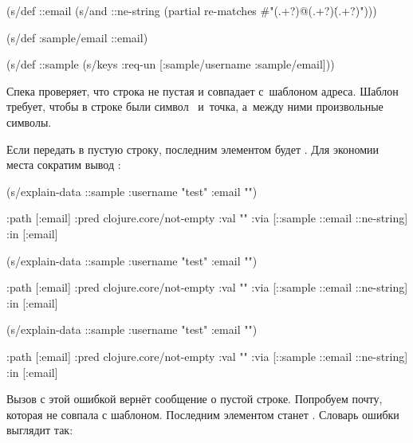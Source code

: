 \else

\begin{clojure}
(s/def ::email
  (s/and
   ::ne-string
   (partial re-matches #"(.+?)@(.+?)\.(.+?)")))

(s/def :sample/email ::email)

(s/def ::sample
  (s/keys :req-un [:sample/username
                   :sample/email]))
\end{clojure}

\fi

Спека  проверяет, что строка не пустая и совпадает с~шаблоном
адреса. Шаблон требует, чтобы в строке были символ~ и~точка, а~между
ними произвольные символы.

Если передать в  пустую строку, последним элементом 
будет . Для экономии места сократим вывод
:

\ifnarrow

\begin{clojure}
(s/explain-data ::sample
  {:username "test" :email ""})

{:path [:email]
 :pred clojure.core/not-empty
 :val ""
 :via [::sample ::email ::ne-string]
 :in [:email]}
\end{clojure}

\else

\ifafive

\begin{clojure}
(s/explain-data ::sample
   {:username "test" :email ""})
\end{clojure}

\pagebreakafive

\begin{clojure}
{:path [:email]
 :pred clojure.core/not-empty
 :val ""
 :via [::sample ::email ::ne-string]
 :in [:email]}
\end{clojure}

\else

\begin{clojure}
(s/explain-data ::sample
   {:username "test" :email ""})

{:path [:email]
 :pred clojure.core/not-empty
 :val ""
 :via [::sample ::email ::ne-string]
 :in [:email]}
\end{clojure}

\fi

\fi

Вызов  с этой ошибкой вернёт сообщение о пустой
строке. Попробуем почту, которая не совпала с шаблоном. Последним элементом
 станет . Словарь ошибки выглядит так:

